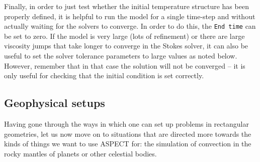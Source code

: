 \documentclass{article}
\newcommand{\aspect}{\textsc{ASPECT}}
\begin{document}
Finally, in order to just test whether the initial temperature structure has been properly defined, it is helpful to run the model for a single time-step and without actually waiting for the solvers to converge. In order to do this, the \texttt{End time} can be set to zero. If the model is very large (lots of refinement) or there are large viscosity jumps that take longer to converge in the Stokes solver, it can also be useful to set the solver tolerance parameters to large values as noted below. However, remember that in that case the solution will not be converged -- it is only useful for checking that the initial condition is set correctly.




\subsection{Geophysical setups}
\label{sec:cookbooks-geophysical}

Having gone through the ways in which one can set up problems in rectangular
geometries, let us now move on to situations that are directed more towards the
kinds of things we want to use \aspect{} for: the simulation of convection in
the rocky mantles of planets or other celestial bodies.
\end{document}
